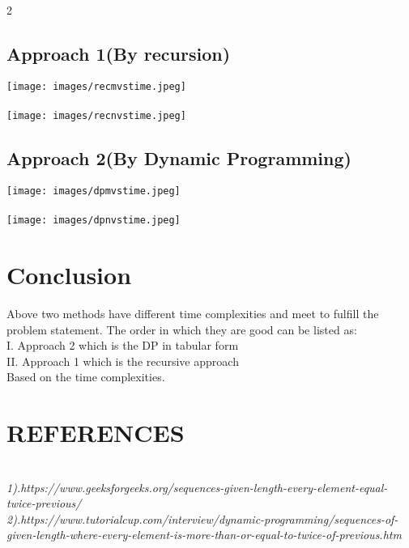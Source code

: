 2\documentclass[conference]{IEEEtran}
\begin{document}
\subsection{Approach 1(By recursion)}
\texttt{[image: images/recmvstime.jpeg]}\\
\\
\texttt{[image: images/recnvstime.jpeg]}
\subsection{Approach 2(By Dynamic Programming)}
\texttt{[image: images/dpmvstime.jpeg]}\\
\\
\texttt{[image: images/dpnvstime.jpeg]}
\section{Conclusion}
Above two methods have different time complexities and meet to fulfill the problem statement. The order in which they are good can be listed as:
\\I. Approach 2 which is the DP in tabular form
\\II. Approach 1 which is the recursive approach
\\Based on the time complexities.
\section{REFERENCES}\\
\textit{1).https://www.geeksforgeeks.org/sequences-given-length-every-element-equal-twice-previous/}\\
\textit{2).https://www.tutorialcup.com/interview/dynamic-programming/sequences-of-given-length-where-every-element-is-more-than-or-equal-to-twice-of-previous.htm}\\
\end{document}
